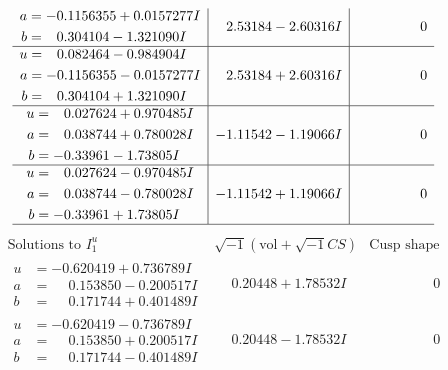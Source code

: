 \documentclass[1p]{elsarticle_modified}
\theoremstyle{definition}
\newcommand{\I}{\sqrt{-1}}
\begin{document}
$$\begin{array}{c|c|c}
\begin{aligned}
a &= -0.1156355 + 0.0157277 I \\
b &= \phantom{-}0.304104 - 1.321090 I\end{aligned}
 & \phantom{-}2.53184 - 2.60316 I & \phantom{-0.000000 } 0 \\ \hline\begin{aligned}
u &= \phantom{-}0.082464 - 0.984904 I \\
a &= -0.1156355 - 0.0157277 I \\
b &= \phantom{-}0.304104 + 1.321090 I\end{aligned}
 & \phantom{-}2.53184 + 2.60316 I & \phantom{-0.000000 } 0 \\ \hline\begin{aligned}
u &= \phantom{-}0.027624 + 0.970485 I \\
a &= \phantom{-}0.038744 + 0.780028 I \\
b &= -0.33961 - 1.73805 I\end{aligned}
 & -1.11542 - 1.19066 I & \phantom{-0.000000 } 0 \\ \hline\begin{aligned}
u &= \phantom{-}0.027624 - 0.970485 I \\
a &= \phantom{-}0.038744 - 0.780028 I \\
b &= -0.33961 + 1.73805 I\end{aligned}
 & -1.11542 + 1.19066 I & \phantom{-0.000000 } 0\\
 \hline 
 \end{array}$$\newpage$$\begin{array}{c|c|c}  
\text{Solutions to }I^u_{1}& \I (\text{vol} + \sqrt{-1}CS) & \text{Cusp shape}\\
 \hline 
\begin{aligned}
u &= -0.620419 + 0.736789 I \\
a &= \phantom{-}0.153850 - 0.200517 I \\
b &= \phantom{-}0.171744 + 0.401489 I\end{aligned}
 & \phantom{-}0.20448 + 1.78532 I & \phantom{-0.000000 } 0 \\ \hline\begin{aligned}
u &= -0.620419 - 0.736789 I \\
a &= \phantom{-}0.153850 + 0.200517 I \\
b &= \phantom{-}0.171744 - 0.401489 I\end{aligned}
 & \phantom{-}0.20448 - 1.78532 I & \phantom{-0.000000 } 0 \\ \hline\begin{aligned}

\end{aligned}
\end{array}$$
\end{document}
